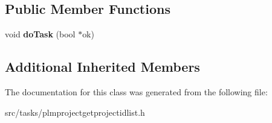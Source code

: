 \subsection*{Public Member Functions}
\begin{DoxyCompactItemize}
\item 
void {\bfseries do\+Task} (bool $\ast$ok)\hypertarget{class_p_l_m_project_get_project_id_list_a50b4ea353012444d28099b54858f9cdb}{}\label{class_p_l_m_project_get_project_id_list_a50b4ea353012444d28099b54858f9cdb}

\end{DoxyCompactItemize}
\subsection*{Additional Inherited Members}


The documentation for this class was generated from the following file\+:\begin{DoxyCompactItemize}
\item 
src/tasks/plmprojectgetprojectidlist.\+h\end{DoxyCompactItemize}
